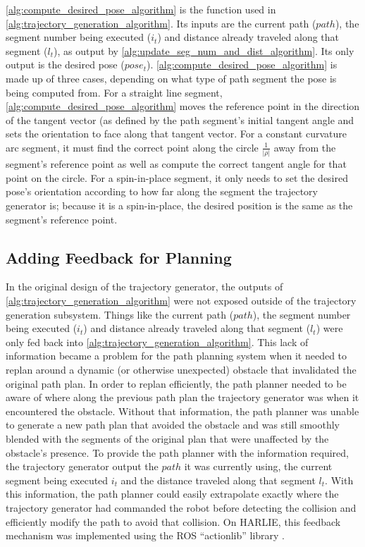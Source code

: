 \autoref{alg:compute_desired_pose_algorithm} is the \ComputeDesiredPose function used in \autoref{alg:trajectory_generation_algorithm}. Its inputs are the current path ($path$), the segment number being executed ($i_t$) and distance already traveled along that segment ($l_t$), as output by \autoref{alg:update_seg_num_and_dist_algorithm}. Its only output is the desired pose ($pose_t$). \autoref{alg:compute_desired_pose_algorithm} is made up of three cases, depending on what type of path segment the pose is being computed from. For a straight line segment, \autoref{alg:compute_desired_pose_algorithm} moves the reference point in the direction of the tangent vector (as defined by the path segment's initial tangent angle and sets the orientation to face along that tangent vector. For a constant curvature arc segment, it must find the correct point along the circle $\frac{1}{ | \rho | }$ away from the segment's reference point as well as compute the correct tangent angle for that point on the circle. For a spin-in-place segment, it only needs to set the desired pose's orientation according to how far along the segment the trajectory generator is; because it is a spin-in-place, the desired position is the same as the segment's reference point.

\subsection{Adding Feedback for Planning}\label{subsec:trajectory_generation_actionlib}

In the original design of the trajectory generator, the outputs of \autoref{alg:trajectory_generation_algorithm} were not exposed outside of the trajectory generation subsystem. Things like the current path ($path$), the segment number being executed ($i_t$) and distance already traveled along that segment ($l_t$) were only fed back into \autoref{alg:trajectory_generation_algorithm}. This lack of information became a problem for the path planning system when it needed to replan around a dynamic (or otherwise unexpected) obstacle that invalidated the original path plan. In order to replan efficiently, the path planner needed to be aware of where along the previous path plan the trajectory generator was when it encountered the obstacle. Without that information, the path planner was unable to generate a new path plan that avoided the obstacle and was still smoothly blended with the segments of the original plan that were unaffected by the obstacle's presence. To provide the path planner with the information required, the trajectory generator output the $path$ it was currently using, the current segment being executed $i_t$ and the distance traveled along that segment $l_t$. With this information, the path planner could easily extrapolate exactly where the trajectory generator had commanded the robot before detecting the collision and efficiently modify the path to avoid that collision. On HARLIE, this feedback mechanism was implemented using the ROS ``actionlib'' library \autocite{ActionLibWiki}.

